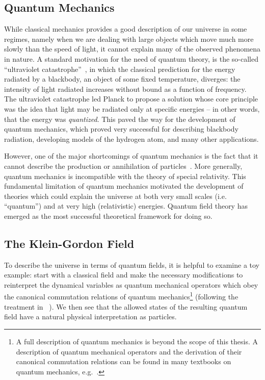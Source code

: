 \subsection{Quantum Mechanics}
While classical mechanics provides a good description of our universe in some regimes, namely when we are dealing with large objects which move much more slowly than the speed of light, it cannot explain many of the observed phenomena in nature.
A standard motivation for the need of quantum theory, is the so-called ``ultraviolet catastrophe''~\cite{Schwartz:2013pla}, in which the classical prediction for the energy radiated by a blackbody, an object of some fixed temperature, diverges: the intensity of light radiated increases without bound as a function of frequency.
The ultraviolet catastrophe led Planck to propose a solution whose core principle was the idea that light may be radiated only at specific energies -- in other words, that the energy was \emph{quantized}.
This paved the way for the development of quantum mechanics, which proved very successful for describing blackbody radiation, developing models of the hydrogen atom, and many other applications.

However, one of the major shortcomings of quantum mechanics is the fact that it cannot describe the production or annihilation of particles~\cite{Zee:2003mt}.
More generally, quantum mechanics is incompatible with the theory of special relativity.
This fundamental limitation of quantum mechanics motivated the development of theories which could explain the universe at both very small scales (i.e. ``quantum'') and at very high (relativistic) energies.
Quantum field theory has emerged as the most successful theoretical framework for doing so.

\subsection{The Klein-Gordon Field}
To describe the universe in terms of quantum fields, it is helpful to examine a toy example: start with a classical field and make the necessary modifications to reinterpret the dynamical variables as quantum mechanical operators which obey the canonical commutation relations of quantum mechanics\footnote{A full description of quantum mechanics is beyond the scope of this thesis. A description of quantum mechanical operators and the derivation of their canonical commutation relations can be found in many textbooks on quantum mechanics, e.g.~\cite{Griffiths:qm}.} (following the treatment in ~\cite{Peskin:1995ev}).
We then see that the allowed states of the resulting quantum field have a natural physical interpretation as particles.

